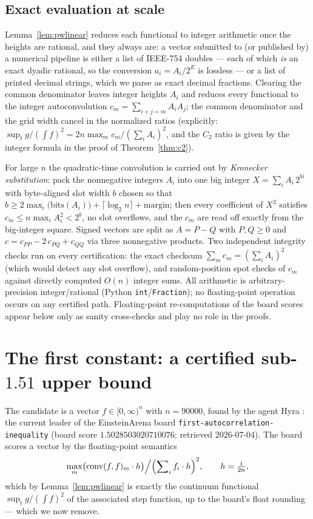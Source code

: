 \documentclass[11pt]{article}
\theoremstyle{remark}
\begin{document}
\subsection{Exact evaluation at scale}\label{sec:exactscale}

Lemma~\ref{lem:pwlinear} reduces each functional to integer arithmetic once
the heights are rational, and they always are: a vector submitted to (or
published by) a numerical pipeline is either a list of IEEE-754 doubles ---
each of which \emph{is} an exact dyadic rational, so the conversion
$a_i = A_i / 2^{E}$ is lossless --- or a list of printed decimal strings,
which we parse as exact decimal fractions. Clearing the common denominator
leaves integer heights $A_i$ and reduces every functional to the integer
autoconvolution $c_m = \sum_{i+j=m} A_i A_j$; the common denominator and the
grid width cancel in the normalized ratios (explicitly:
$\sup_t g / (\int f)^2 = 2n \max_m c_m / (\sum_i A_i)^2$, and the $C_2$
ratio is given by the integer formula in the proof of
Theorem~\ref{thm:c2}).

For large $n$ the quadratic-time convolution is carried out by
\emph{Kronecker substitution}: pack the nonnegative integers $A_i$ into one
big integer $X = \sum_i A_i\, 2^{b i}$ with byte-aligned slot width $b$
chosen so that $b \ge 2\max_i \bigl(\text{bits}(A_i)\bigr) +
\lceil \log_2 n \rceil + \text{margin}$; then every coefficient of $X^2$
satisfies $c_m \le n \max_i A_i^2 < 2^{b}$, no slot overflows, and the
$c_m$ are read off exactly from the big-integer square. Signed vectors are
split as $A = P - Q$ with $P, Q \ge 0$ and
$c = c_{PP} - 2\,c_{PQ} + c_{QQ}$ via three nonnegative products. Two
independent integrity checks run on every certification: the exact checksum
$\sum_m c_m = (\sum_i A_i)^2$ (which would detect any slot overflow), and
random-position spot checks of $c_m$ against directly computed
$O(n)$ integer sums. All arithmetic is arbitrary-precision integer/rational
(Python \texttt{int}/\texttt{Fraction}); no floating-point operation occurs
on any certified path. Floating-point re-computations of the board scores
appear below only as sanity cross-checks and play no role in the proofs.

\section{The first constant: a certified sub-\texorpdfstring{$1.51$}{1.51}
upper bound}\label{sec:c1}

The candidate is a vector $f \in [0,\infty)^n$ with $n = 90000$, found by
the agent Hyra \cite{Hyra26}: the current leader of the EinsteinArena board
\texttt{first-autocorrelation-inequality} (board score
$1.5028503020710076$; retrieved 2026-07-04). The board scores a vector by
the floating-point semantics
\[
\max_m \bigl(\mathrm{conv}(f,f)_m \cdot h\bigr) \Big/
\Bigl(\sum\nolimits_i f_i \cdot h\Bigr)^{2}, \qquad h = \tfrac{1}{2n},
\]
which by Lemma~\ref{lem:pwlinear} is exactly the continuum functional
$\sup_t g / (\int f)^2$ of the associated step function, up to the board's
float rounding --- which we now remove.
\end{document}
